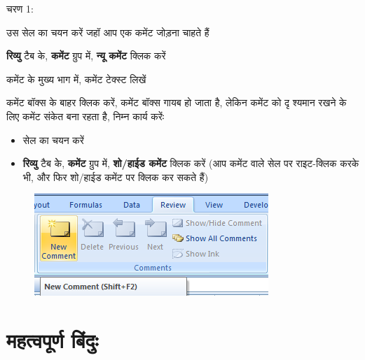 \begin{descriptionSimple}{चरण 1:}
\item[चरण 1] उस सेल का चयन करें जहॉ आप एक कमेंट जोड़ना चाहते हैं
\item[चरण 2] \textbf{रिव्यु} टैब के, \textbf{कमेंट} ग्रुप  में, \textbf{न्यू कमेंट} क्लिक करें
\item[चरण 3] कमेंट के मुख्य भाग में, कमेंट टेक्स्ट लिखें
\item[चरण 4] कमेंट बॉक्स के बाहर क्लिक करें, कमेंट बॉक्स गायब हो जाता है, लेकिन कमेंट को दृ श्यमान रखने के लिए कमेंट संकेत बना रहता है, निम्न कार्य करेंः
		\begin{itemize}[topsep=-1ex,parsep=0ex,partopsep=0ex,itemsep=0.5ex]
		\item सेल का चयन करें
		\item \textbf{रिव्यु} टैब केे, \textbf{कमेंट} ग्रुप में, \textbf{शो/हाईड कमेंट} क्लिक करें (आप कमेंट वाले सेल पर राइट-क्लिक करके भी, और फिर शो/हाईड कमेंट पर क्लिक कर सकते हैं)
		\end{itemize}
\end{descriptionSimple}
\medskip

\begin{figure}[H]
\centering
\includegraphics[scale=0.5]{src/images/chapter1/chapter1_fig73.png}
\end{figure}				

\section*{महत्वपूर्ण बिंदुः}

